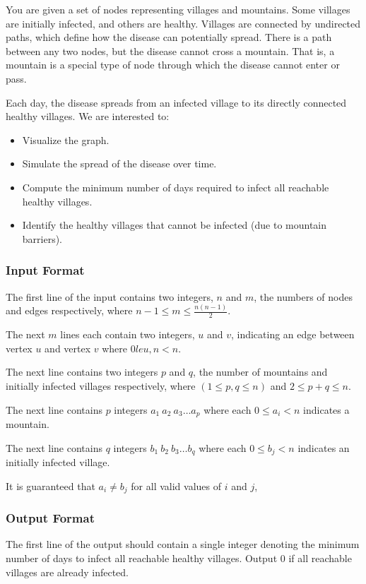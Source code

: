 \documentclass[a4paper]{exam}
\newcommand\heading[1]{\subsubsection*{#1}}
\begin{document}
\begin{questions}
  


  You are given a set of nodes representing villages and mountains. Some villages are initially infected, and others are healthy. Villages are connected by undirected paths, which define how the disease can potentially spread. There is a path between any two nodes, but the disease cannot cross a mountain. That is, a mountain is a special type of node through which the disease cannot enter or pass.
  
Each day, the disease spreads from an infected village to its directly connected healthy villages. We are interested to:
\begin{itemize}
\item Visualize the graph.
\item Simulate the spread of the disease over time.
\item Compute the minimum number of days required to infect all reachable healthy villages.
\item Identify the healthy villages that cannot be infected (due to mountain barriers).
\end{itemize}

\heading{Input Format}

The first line of the input contains two integers, $n$ and $m$, the numbers of nodes and edges respectively, where $n-1\le m\le \frac{n(n-1)}{2}$.

The next $m$ lines each contain two integers, $u$ and $v$, indicating an edge between vertex $u$ and vertex $v$ where $0 le u,n < n$.

The next line contains two integers $p$ and $q$, the number of mountains and initially infected villages respectively, where $(1\le p,q \le n)$ and $2\le p+q \le n$.

The next line contains $p$ integers $a_1\ a_2\ a_3\ldots a_p$ where each $0 \le a_i< n$ indicates a mountain.

The next line contains $q$ integers $b_1\ b_2\ b_3\ldots b_q$ where each $0 \le b_j< n$ indicates an initially infected village.

It is guaranteed that $a_i\ne b_j$ for all valid values of $i$ and $j$,

\heading{Output Format}

The first line of the output should contain a single integer denoting the minimum number of days to infect all reachable healthy villages. Output 0 if all reachable villages are already infected.


\end{questions}
\end{document}
